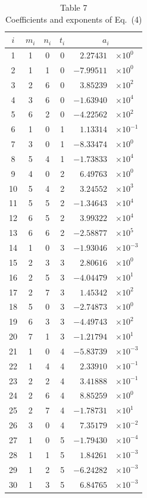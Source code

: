 \documentclass[11pt]{article}
\begin{document}
\begin{table}[htbp]
\centering
\footnotesize
\caption*{Table 7\\ Coefficients and exponents of Eq.~(4)}
\begin{tabular}{ccccr@{}l}
\toprule
$i$ & $m_i$ & $n_i$ & $t_i$ & \multicolumn{2}{c}{$a_i$} \\
\midrule
1  & 1 & 0 & 0 & $2.27431$   & $\times10^{0}$ \\
2  & 1 & 1 & 0 & $-7.99511$ & $\times10^{0}$ \\
3  & 2 & 6 & 0 & $3.85239$   & $\times10^{2}$ \\
4  & 3 & 6 & 0 & $-1.63940$ & $\times10^{4}$ \\
5  & 6 & 2 & 0 & $-4.22562$ & $\times10^{2}$ \\
6  & 1 & 0 & 1 & $1.13314$   & $\times10^{-1}$ \\
7  & 3 & 0 & 1 & $-8.33474$ & $\times10^{0}$ \\
8  & 5 & 4 & 1 & $-1.73833$ & $\times10^{4}$ \\
9  & 4 & 0 & 2 & $6.49763$   & $\times10^{0}$ \\
10 & 5 & 4 & 2 & $3.24552$   & $\times10^{3}$ \\
11 & 5 & 5 & 2 & $-1.34643$ & $\times10^{4}$ \\
12 & 6 & 5 & 2 & $3.99322$   & $\times10^{4}$ \\
13 & 6 & 6 & 2 & $-2.58877$ & $\times10^{5}$ \\
14 & 1 & 0 & 3 & $-1.93046$ & $\times10^{-3}$ \\
15 & 2 & 3 & 3 & $2.80616$   & $\times10^{0}$ \\
16 & 2 & 5 & 3 & $-4.04479$ & $\times10^{1}$ \\
17 & 2 & 7 & 3 & $1.45342$   & $\times10^{2}$ \\
18 & 5 & 0 & 3 & $-2.74873$ & $\times10^{0}$ \\
19 & 6 & 3 & 3 & $-4.49743$ & $\times10^{2}$ \\
20 & 7 & 1 & 3 & $-1.21794$ & $\times10^{1}$ \\
21 & 1 & 0 & 4 & $-5.83739$ & $\times10^{-3}$ \\
22 & 1 & 4 & 4 & $2.33910$   & $\times10^{-1}$ \\
23 & 2 & 2 & 4 & $3.41888$   & $\times10^{-1}$ \\
24 & 2 & 6 & 4 & $8.85259$   & $\times10^{0}$ \\
25 & 2 & 7 & 4 & $-1.78731$ & $\times10^{1}$ \\
26 & 3 & 0 & 4 & $7.35179$   & $\times10^{-2}$ \\
27 & 1 & 0 & 5 & $-1.79430$ & $\times10^{-4}$ \\
28 & 1 & 1 & 5 & $1.84261$   & $\times10^{-3}$ \\
29 & 1 & 2 & 5 & $-6.24282$ & $\times10^{-3}$ \\
30 & 1 & 3 & 5 & $6.84765$   & $\times10^{-3}$ \\
\bottomrule
\end{tabular}


\end{table}
\end{document}
